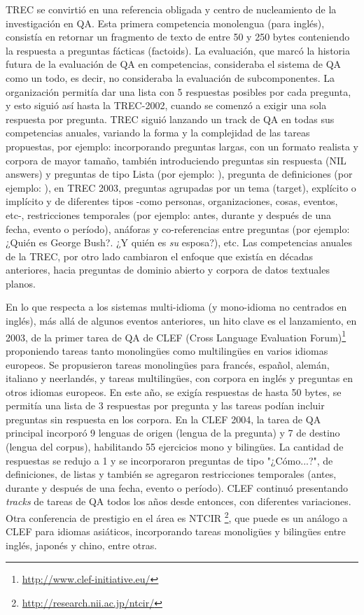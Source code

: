 TREC se convirtió en una referencia obligada y centro de nucleamiento de la investigación en QA. Esta primera competencia monolengua (para inglés), consistía en retornar un fragmento de texto de entre 50 y 250 bytes conteniendo la respuesta a preguntas fácticas (factoids). La evaluación, que marcó la historia futura de la evaluación de QA en competencias, consideraba el sistema de QA como un todo, es decir, no consideraba la evaluación de subcomponentes. La organización permitía dar una lista con 5 respuestas posibles por cada pregunta, y esto siguió así hasta la TREC-2002, cuando se comenzó a exigir una sola respuesta por pregunta. TREC siguió lanzando un track de QA en todas sus competencias anuales, variando la forma y la complejidad de las tareas propuestas, por ejemplo: incorporando preguntas largas, con un formato realista y corpora de mayor tamaño, también introduciendo preguntas sin respuesta (NIL answers) y preguntas de tipo Lista (por ejemplo: ), pregunta de definiciones (por ejemplo: ), en TREC 2003, preguntas agrupadas por un tema (target), explícito o implícito y de diferentes tipos -como personas, organizaciones, cosas, eventos, etc-, restricciones temporales (por ejemplo: antes, durante y después de una fecha, evento o período), anáforas y co-referencias entre preguntas (por ejemplo: ¿Quién es George Bush?. ¿Y quién es \textit{su} esposa?), etc. Las competencias anuales de la TREC, por otro lado cambiaron el enfoque que existía en décadas anteriores, hacia preguntas de dominio abierto y corpora de datos textuales planos. 

En lo que respecta a los sistemas multi-idioma (y mono-idioma no centrados en inglés), más allá de algunos eventos anteriores, un hito clave es el lanzamiento, en 2003, de la primer tarea de QA \cite{CLEF03} de CLEF (Cross Language Evaluation Forum)\footnote{\url{http://www.clef-initiative.eu/}} proponiendo tareas tanto monolingües como multilingües en varios idiomas europeos. Se propusieron tareas monolingües para francés, español, alemán, italiano y neerlandés, y tareas multilingües, con corpora en inglés y preguntas en otros idiomas europeos. En este año, se exigía respuestas de hasta 50 bytes, se permitía una lista de 3 respuestas por pregunta y las tareas podían incluir preguntas sin respuesta en los corpora. En la CLEF 2004, la tarea de QA principal incorporó 9 lenguas de origen (lengua de la pregunta) y 7 de destino (lengua del corpus), habilitando 55 ejercicios mono y bilingües. La cantidad de respuestas se redujo a 1 y se incorporaron preguntas de tipo "¿Cómo...?", de definiciones, de listas y también se agregaron restricciones temporales (antes, durante y después de una fecha, evento o período). CLEF continuó presentando {\em tracks} de tareas de QA todos los años desde entonces, con diferentes variaciones. Otra conferencia de prestigio en el área es NTCIR \footnote{\url{http://research.nii.ac.jp/ntcir/}}, que puede es un análogo a CLEF para idiomas asiáticos, incorporando tareas monoligües y bilingües entre inglés, japonés y chino, entre otras.

